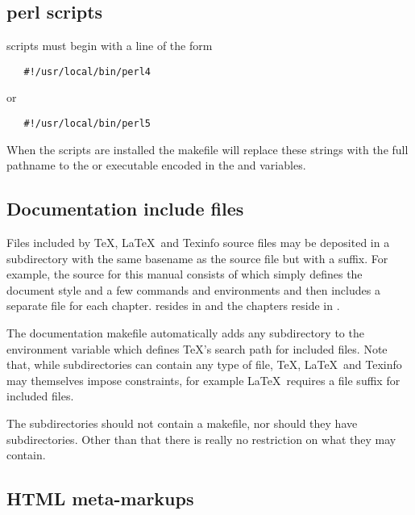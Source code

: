 \subsection*{perl scripts}

 scripts must begin with a line of the form

\begin{verbatim}
   #!/usr/local/bin/perl4
\end{verbatim}

\noindent
or

\begin{verbatim}
   #!/usr/local/bin/perl5
\end{verbatim}

\noindent
When the scripts are installed the makefile will replace these strings with
the full pathname to the  or  executable encoded
in the  and   variables.

\subsection*{Documentation include files}

Files included by \TeX , \LaTeX\, and Texinfo source files may be deposited in
a subdirectory with the same basename as the source file but with a
 suffix.  For example, the source for this manual consists of
 which simply defines the document style and a few commands
and environments and then includes a separate  file for each
chapter.   resides in  and
the chapters reside in .

The documentation makefile automatically adds any  subdirectory to
the  environment variable which defines \TeX 's search path
for included files.  Note that, while  subdirectories can contain
any type of file, \TeX , \LaTeX\, and Texinfo may themselves impose
constraints, for example \LaTeX\ requires a  file suffix for
included files.

The  subdirectories should not contain a makefile, nor should they
have subdirectories.  Other than that there is really no restriction on
what they may contain.

\subsection*{HTML meta-markups}

